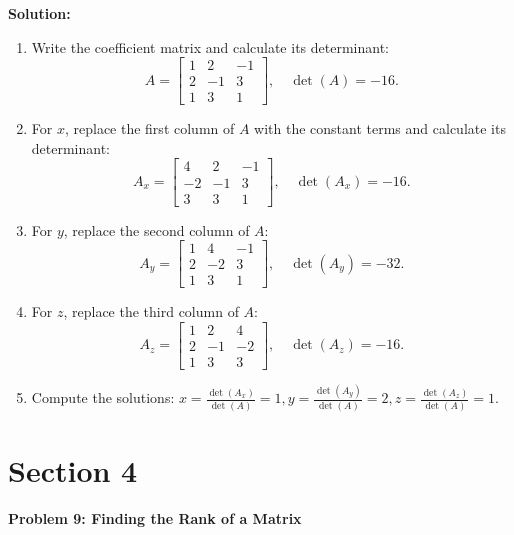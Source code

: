 \documentclass[8pt, a4paper, landscape]{extarticle}
\begin{document}
\begin{multicols*}{3}
  \textbf{Solution:}
  \begin{enumerate}
    \item Write the coefficient matrix and calculate its determinant:
          \[
            A = \begin{bmatrix}
              1 & 2  & -1 \\
              2 & -1 & 3  \\
              1 & 3  & 1
            \end{bmatrix}, \quad \det(A) = -16.
          \]
    \item For $x$, replace the first column of $A$ with the constant terms and calculate its determinant:
          \[
            A_x = \begin{bmatrix}
              4  & 2  & -1 \\
              -2 & -1 & 3  \\
              3  & 3  & 1
            \end{bmatrix}, \quad \det(A_x) = -16.
          \]
    \item For $y$, replace the second column of $A$:
          \[
            A_y = \begin{bmatrix}
              1 & 4  & -1 \\
              2 & -2 & 3  \\
              1 & 3  & 1
            \end{bmatrix}, \quad \det(A_y) = -32.
          \]
    \item For $z$, replace the third column of $A$:
          \[
            A_z = \begin{bmatrix}
              1 & 2  & 4  \\
              2 & -1 & -2 \\
              1 & 3  & 3
            \end{bmatrix}, \quad \det(A_z) = -16.
          \]
    \item Compute the solutions: $x = \frac{\det(A_x)}{\det(A)} = 1, y = \frac{\det(A_y)}{\det(A)} = 2, z = \frac{\det(A_z)}{\det(A)} = 1$.
  \end{enumerate}


  \columnbreak

  \section*{Section 4}

  \textbf{Problem 9: Finding the Rank of a Matrix}


\end{multicols*}
\end{document}
